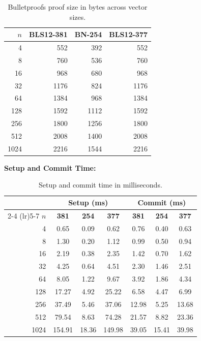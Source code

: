 \begin{table}[H]
\centering
\caption{Bulletproofs proof size in bytes across vector sizes.}
\label{tab:bp-proof-size}
\begin{tabular}{rrrr}
\toprule
$n$ & \textbf{BLS12-381} & \textbf{BN-254} & \textbf{BLS12-377} \\
\midrule
4    & 552  & 392  & 552  \\
8    & 760  & 536  & 760  \\
16   & 968  & 680  & 968  \\
32   & 1176 & 824  & 1176 \\
64   & 1384 & 968  & 1384 \\
128  & 1592 & 1112 & 1592 \\
256  & 1800 & 1256 & 1800 \\
512  & 2008 & 1400 & 2008 \\
1024 & 2216 & 1544 & 2216 \\
\bottomrule
\end{tabular}
\end{table}

\textbf{Setup and Commit Time:}

\begin{table}[H]
\centering
\caption{Setup and commit time in milliseconds.}
\label{tab:bp-setup-commit}
\begin{tabular}{rcccccc}
\toprule
& \multicolumn{3}{c}{\textbf{Setup (ms)}} & \multicolumn{3}{c}{\textbf{Commit (ms)}} \\
\cmidrule(lr){2-4} \cmidrule(lr){5-7}
$n$ & \textbf{381} & \textbf{254} & \textbf{377}
    & \textbf{381} & \textbf{254} & \textbf{377} \\
\midrule
4    & 0.65   & 0.09  & 0.62   & 0.76  & 0.40  & 0.63  \\
8    & 1.30   & 0.20  & 1.12   & 0.99  & 0.50  & 0.94  \\
16   & 2.19   & 0.38  & 2.35   & 1.42  & 0.70  & 1.62  \\
32   & 4.25   & 0.64  & 4.51   & 2.30  & 1.46  & 2.51  \\
64   & 8.05   & 1.22  & 9.67   & 3.92  & 1.86  & 4.34  \\
128  & 17.27  & 4.92  & 25.22  & 6.58  & 4.47  & 6.99  \\
256  & 37.49  & 5.46  & 37.06  & 12.98 & 5.25  & 13.68 \\
512  & 79.54  & 8.63  & 74.28  & 21.57 & 8.82  & 23.36 \\
1024 & 154.91 & 18.36 & 149.98 & 39.05 & 15.41 & 39.98 \\
\bottomrule
\end{tabular}
\end{table}

